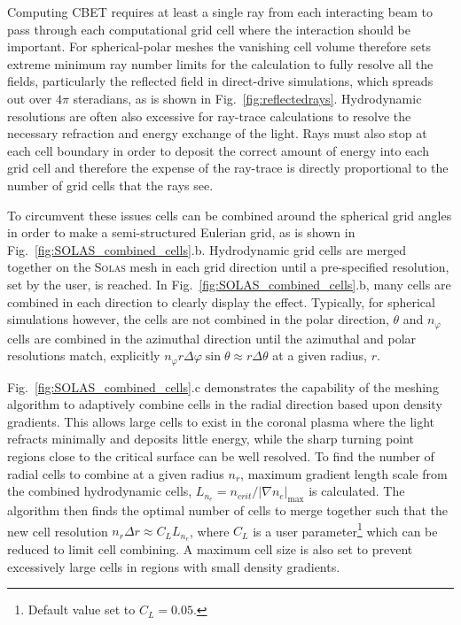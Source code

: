 Computing \ac{CBET} requires at least a single ray from each interacting beam to pass through each computational grid cell where the interaction should be important.
For spherical-polar meshes the vanishing cell volume therefore sets extreme minimum ray number limits for the calculation to fully resolve all the fields, particularly the reflected field in direct-drive simulations, which spreads out over $4\pi$ steradians, as is shown in Fig.~\ref{fig:reflectedrays}.
Hydrodynamic resolutions are often also excessive for ray-trace calculations to resolve the necessary refraction and energy exchange of the light.
Rays must also stop at each cell boundary in order to deposit the correct amount of energy into each grid cell and therefore the expense of the ray-trace is directly proportional to the number of grid cells that the rays see.

To circumvent these issues cells can be combined around the spherical grid angles in order to make a semi-structured Eulerian grid, as is shown in Fig.~\ref{fig:SOLAS_combined_cells}.b.
Hydrodynamic grid cells are merged together on the \textsc{Solas} mesh in each grid direction until a pre-specified resolution, set by the user, is reached.
In Fig.~\ref{fig:SOLAS_combined_cells}.b, many cells are combined in each direction to clearly display the effect.
Typically, for spherical simulations however, the cells are not combined in the polar direction, $\theta$ and $n_{\varphi}$ cells are combined in the azimuthal direction until the azimuthal and polar resolutions match, explicitly $n_{\varphi}r\Delta\varphi\sin\theta \approx r \Delta\theta$ at a given radius, $r$.

Fig.~\ref{fig:SOLAS_combined_cells}.c demonstrates the capability of the meshing algorithm to adaptively combine cells in the radial direction based upon density gradients.
This allows large cells to exist in the coronal plasma where the light refracts minimally and deposits little energy, while the sharp turning point regions close to the critical surface can be well resolved.
To find the number of radial cells to combine at a given radius $n_r$, maximum gradient length scale from the combined hydrodynamic cells, $L_{n_e}=n_{crit}/|\nabla n_e|_{\max}$ is calculated.
The algorithm then finds the optimal number of cells to merge together such that the new cell resolution $n_r\Delta r \approx C_L L_{n_e}$, where $C_L$ is a user parameter\footnote{Default value set to $C_L=0.05$.} which can be reduced to limit cell combining.
A maximum cell size is also set to prevent excessively large cells in regions with small density gradients.

